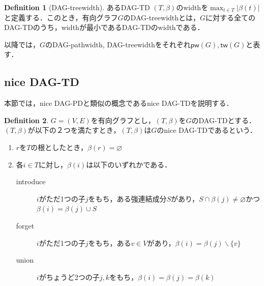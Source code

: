 \documentclass[master]{kuisthesis}		%
\theoremstyle{plain}
\theoremstyle{definition}
\newtheorem{definition*}{Definition}
\begin{document}
\begin{definition*}[DAG-treewidth]
    あるDAG-TD $(T, \beta)$のwidthを$\max_{t \in T}|\beta(t)|$と定義する．このとき，有向グラフ$G$のDAG-treewidthとは，$G$に対する全てのDAG-TDのうち，widthが最小であるDAG-TDのwidthである．
\end{definition*}

以降では，$G$のDAG-pathwidth, DAG-treewidthをそれぞれ$\mathsf{pw}(G), \mathsf{tw}(G)$と表す．


\subsection{nice DAG-TD}

本節では，nice DAG-PDと類似の概念であるnice DAG-TDを説明する．

\begin{definition*}
 $G=(V, E)$を有向グラフとし，$(T, \beta)$を$G$のDAG-TDとする．$(T, \beta)$が以下の２つを満たすとき，$(T, \beta)$は$G$のnice DAG-TDであるという．
 
\begin{enumerate}
    \item $r$を$T$の根としたとき，$\beta(r) = \varnothing$ 
    \item 各$i \in T$に対し，$\beta(i)$は以下のいずれかである．
    \begin{description}
          \item[introduce] $i$がただ1つの子$j$をもち，ある強連結成分$S$があり，$S \cap \beta(j) \neq \varnothing$かつ$\beta(i) = \beta(j) \cup S$
          \item[forget] $i$がただ1つの子$j$をもち，ある$v \in V$があり，$\beta(i) = \beta(j) \backslash \{v\}$
          \item[union] $i$がちょうど2つの子$j, k$をもち，$\beta(i) = \beta(j) = \beta(k)$
    \end{description}
    \end{enumerate}
\end{definition*}
\end{document}
